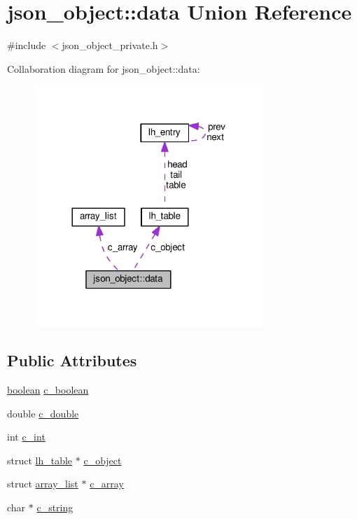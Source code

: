 \hypertarget{unionjson__object_1_1data}{}\section{json\+\_\+object\+:\+:data Union Reference}
\label{unionjson__object_1_1data}


{\ttfamily \#include $<$json\+\_\+object\+\_\+private.\+h$>$}



Collaboration diagram for json\+\_\+object\+:\+:data\+:
\nopagebreak
\begin{figure}[H]
\begin{center}
\leavevmode
\includegraphics[width=245pt]{unionjson__object_1_1data__coll__graph}
\end{center}
\end{figure}
\subsection*{Public Attributes}
\begin{DoxyCompactItemize}
\item 
\hyperlink{json__object_8h_a621c38f1f10a1c565d897e3178b16d6e}{boolean} \hyperlink{unionjson__object_1_1data_ace8860a384f47f7cbe7e656eb2632fc0}{c\+\_\+boolean}
\item 
double \hyperlink{unionjson__object_1_1data_a9cc4abdb21302913701ac0c8dc75e55a}{c\+\_\+double}
\item 
int \hyperlink{unionjson__object_1_1data_a397c3575aeea167c47dff9594d1e4aab}{c\+\_\+int}
\item 
struct \hyperlink{structlh__table}{lh\+\_\+table} $\ast$ \hyperlink{unionjson__object_1_1data_a68089c942f154d4df590d8ecb476a69b}{c\+\_\+object}
\item 
struct \hyperlink{structarray__list}{array\+\_\+list} $\ast$ \hyperlink{unionjson__object_1_1data_a4ad6bf2fd6d8718f55850509edfe2e45}{c\+\_\+array}
\item 
char $\ast$ \hyperlink{unionjson__object_1_1data_a2749f46b4691f85695cecb9f4e365321}{c\+\_\+string}
\end{DoxyCompactItemize}


